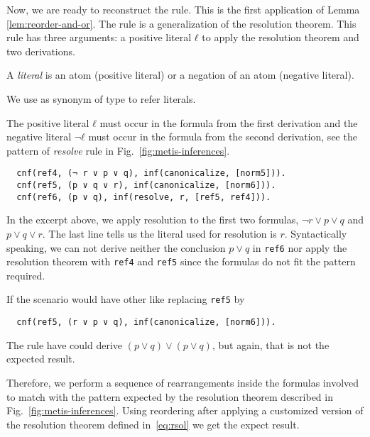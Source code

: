 \documentclass[../../main.tex]{subfiles}
\begin{document}
Now, we are ready to reconstruct the \resolve rule. This is the
first application of Lemma \ref{lem:reorder-and-or}.
The \resolve rule is a generalization of the resolution theorem.
This rule has three arguments: a positive literal $ℓ$ to apply the
resolution theorem and two derivations.

\begin{definition}
A \emph{literal} is an atom (positive literal) or a negation
of an atom (negative literal).
\end{definition}

\begin{notation}
We use \Lit as synonym of \Prop type to refer literals.
\end{notation}

The positive literal $ℓ$ must occur in
the formula from the first derivation and the
negative literal $¬ ℓ$ must occur in the formula from the second derivation,
see the pattern of \emph{resolve} rule in Fig.~\ref{fig:metis-inferences}.

\begin{myexamplenum}\hspace{10cm}
\label{ex:resolve-tstp}
\begin{verbatim}
  cnf(ref4, (¬ r ∨ p ∨ q), inf(canonicalize, [norm5])).
  cnf(ref5, (p ∨ q ∨ r), inf(canonicalize, [norm6])).
  cnf(ref6, (p ∨ q), inf(resolve, r, [ref5, ref4])).
\end{verbatim}
In the excerpt above, we apply resolution to the first two formulas,
$¬ r ∨ p ∨ q$ and $p ∨ q ∨ r$. The last line tells us the literal used
for resolution is $r$. Syntactically speaking,
we can not derive neither the conclusion $p ∨ q$ in \verb!ref6! nor apply the resolution theorem with \verb!ref4! and \verb!ref5! since the formulas do not fit the pattern required.

If the scenario would have other like replacing \verb!ref5! by
\begin{verbatim}
  cnf(ref5, (r ∨ p ∨ q), inf(canonicalize, [norm6])).
\end{verbatim}
The \resolve rule have could derive $(p ∨ q) ∨ (p ∨ q)$, but again, that is not the expected result.
\end{myexamplenum}

Therefore, we perform a sequence of rearrangements inside the
formulas involved to match with the pattern expected by the resolution theorem
described in Fig.~\ref{fig:metis-inferences}. Using reordering after
applying a customized version of the resolution theorem defined
in~\eqref{eq:rsol} we get the expect result.
\end{document}
